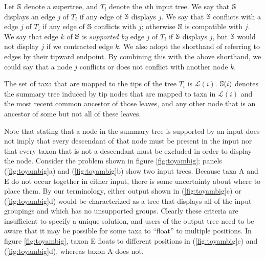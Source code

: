 \documentclass[fleqn,12pt,lineno,english]{wlpeerj}
\begin{document}
Let $\mathbb{S}$ denote a supertree, and $T_{i}$ denote the $i$th
input tree. We say that $\mathbb{S}$ displays an edge $j$ of $T_{i}$
if any edge of $\mathbb{S}$ displays $j$. We say that $\mathbb{S}$
conflicts with a edge $j$ of $T_{i}$ if any edge of $\mathbb{S}$
conflicts with $j$; otherwise $\mathbb{S}$ is compatible with
$j$. We say that edge $k$ of $\mathbb{S}$ is \emph{supported
by} edge $j$ of $T_{i}$ if $\mathbb{S}$ displays $j$, but $\mathbb{S}$
would not display $j$ if we contracted edge $k$. We also adopt the
shorthand of referring to edges by their tipward endpoint. By combining
this with the above shorthand, we could say that a node $j$ conflicts
or does not conflict with another node $k$.

The set of taxa that are mapped to the tips of the tree $T_{i}$ is
$\mathcal{L}(i)$. $\mathbb{S}(i)$ denotes the summary tree induced
by tip nodes that are mapped to taxa in $\mathcal{L}(i)$ and the
most recent common ancestor of those leaves, and any other node that
is an ancestor of some but not all of these leaves. 

Note that stating that a node in the summary tree is supported by
an input does not imply that every descendant of that node must be
present in the input nor that every taxon that is not a descendant
must be excluded in order to display the node. Consider the problem
shown in figure \ref{fig:toyambig}; panels (\ref{fig:toyambig}a)
and (\ref{fig:toyambig}b) show two input trees. Because taxa A and
E do not occur together in either input, there is some uncertainty
about where to place them. By our terminology, either output shown
in (\ref{fig:toyambig}c) or (\ref{fig:toyambig}d) would be characterized
as a tree that displays all of the input groupings and which has no
unsupported groups. Clearly these criteria are insufficient to specify
a unique solution, and users of the output tree need to be aware that
it may be possible for some taxa to ``float'' to multiple positions.
In figure \ref{fig:toyambig}, taxon E floats to different positions
in (\ref{fig:toyambig}c) and (\ref{fig:toyambig}d), whereas taxon
A does not. 
\end{document}
